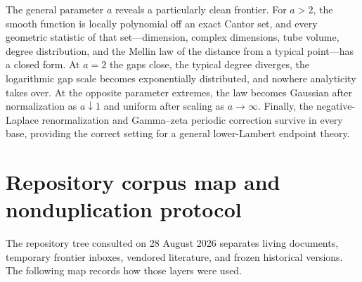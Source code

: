 \documentclass[11pt,oneside]{article}
\theoremstyle{definition}
\theoremstyle{remark}
\begin{document}
The general parameter $a$ reveals a particularly clean frontier.  For $a>2$, the smooth
function is locally polynomial off an exact Cantor set, and every geometric statistic of
that set---dimension, complex dimensions, tube volume, degree distribution, and the Mellin law
of the distance from a typical point---has a closed form.  At $a=2$ the gaps close, the typical
degree diverges, the logarithmic gap scale becomes exponentially distributed, and nowhere analyticity takes
over.  At the opposite parameter extremes, the law becomes Gaussian after normalization as
$a\downarrow1$ and uniform after scaling as $a\to\infty$.  Finally, the negative-Laplace
renormalization and Gamma--zeta periodic correction survive in every base, providing the
correct setting for a general lower-Lambert endpoint theory.

\appendix

\section{Repository corpus map and nonduplication protocol}
\label{app:repo-audit}

The repository tree consulted on 28 August 2026 separates living documents, temporary frontier
inboxes, vendored literature, and frozen historical versions.  The following map records how
those layers were used.
\end{document}
